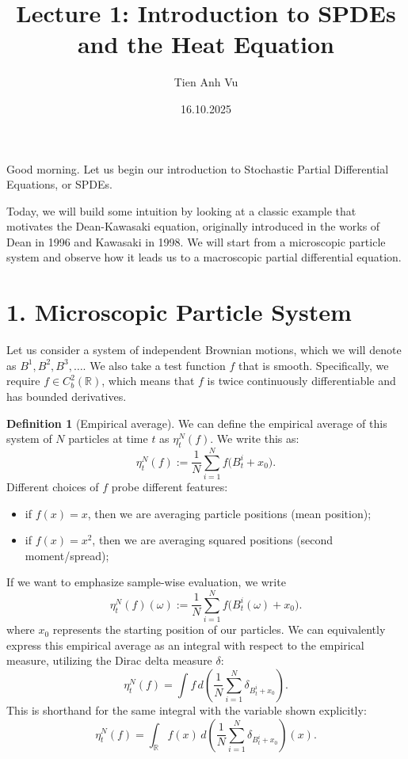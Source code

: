 \documentclass[11pt]{article}
\title{Lecture 1: Introduction to SPDEs and the Heat Equation}
\date{16.10.2025}
\author{Tien Anh Vu}
\theoremstyle{definition}
\newtheorem{definition}{Definition}
\theoremstyle{remark}
\begin{document}
\maketitle

Good morning. Let us begin our introduction to Stochastic Partial Differential Equations, or SPDEs.

Today, we will build some intuition by looking at a classic example that motivates the Dean-Kawasaki equation, originally introduced in the works of Dean in 1996 and Kawasaki in 1998. We will start from a microscopic particle system and observe how it leads us to a macroscopic partial differential equation.

\section*{1. Microscopic Particle System}
Let us consider a system of independent Brownian motions, which we will denote as $B^1, B^2, B^3, \ldots$. We also take a test function $f$ that is smooth. Specifically, we require $f\in C_b^2(\mathbb{R})$, which means that $f$ is twice continuously differentiable and has bounded derivatives.

\begin{definition}[Empirical average]
We can define the empirical average of this system of $N$ particles at time $t$ as $\eta_t^N(f)$. We write this as:
\[
\eta_t^N(f):=\frac{1}{N}\sum_{i=1}^{N} f\bigl(B_t^i+x_0\bigr).
\]
Different choices of $f$ probe different features:
\begin{itemize}
\item if $f(x)=x$, then we are averaging particle positions (mean position);
\item if $f(x)=x^2$, then we are averaging squared positions (second moment/spread);
\end{itemize}
If we want to emphasize sample-wise evaluation, we write
\[
\eta_t^N(f)(\omega):=\frac{1}{N}\sum_{i=1}^{N} f\bigl(B_t^i(\omega)+x_0\bigr).
\]
where $x_0$ represents the starting position of our particles. We can equivalently express this empirical average as an integral with respect to the empirical measure, utilizing the Dirac delta measure $\delta$:
\[
\eta_t^N(f)=\int f\,d\!\left(\frac{1}{N}\sum_{i=1}^{N}\delta_{B_t^i+x_0}\right).
\]
This is shorthand for the same integral with the variable shown explicitly:
\[
\eta_t^N(f)=\int_{\mathbb R} f(x)\,d\!\left(\frac{1}{N}\sum_{i=1}^{N}\delta_{B_t^i+x_0}\right)(x).
\]
\end{definition}
\end{document}
